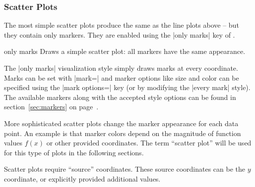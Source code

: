 \subsubsection{Scatter Plots}
The most simple scatter plots produce the same as the line plots above -- but they contain only markers. They are enabled using the |only marks| key of \Tikz.
\begin{plottype}{only marks}
Draws a simple scatter plot: all markers have the same appearance.
\begin{codeexample}[]
\end{codeexample}
	The |only marks| visualization style simply draws marks at every coordinate. Marks can be set with |mark=| and marker options like size and color can be specified using the |mark options=| key (or by modifying the |every mark| style). The available markers along with the accepted style options can be found in section~\ref{sec:markers} on page~\pageref{sec:markers}.
\end{plottype}

\label{pgfplots:scatter}
More sophisticated scatter plots change the marker appearance for each data point. An example is that marker colors depend on the magnitude of function values $f(x)$ or other provided coordinates. The term ``scatter plot'' will be used for this type of plots in the following sections.

Scatter plots require ``source'' coordinates. These source coordinates can be the $y$ coordinate, or explicitly provided additional values.

